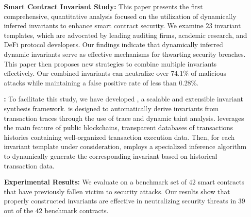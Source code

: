 \noindent \textbf{Smart Contract Invariant Study:}
This paper presents the first comprehensive, quantitative analysis focused on
the utilization of dynamically inferred invariants to enhance smart contract security. We
examine $23$ invariant templates, which are advocated by leading auditing firms,
academic research, and DeFi protocol developers. Our findings indicate that
dynamically inferred dynamic invariants serve as effective mechanisms for 
thwarting security
breaches. This paper then proposes new strategies to combine multiple invariants effectively.
Our combined invariants can neutralize over
74.1\% of malicious attacks while maintaining a false positive rate of less than
0.28\%.

\noindent \textbf{{\name}:}
To facilitate this study, we have developed {\name}, a scalable and extensible
invariant synthesis framework. {\name} is designed to automatically derive
invariants from transaction traces through the use of trace and dynamic taint analysis. 
{\name} leverages the main feature of public blockchains, 
transparent databases of transactions histories containing well-organized transaction execution data. 
Then, for each invariant template under consideration, {\name} employs a specialized inference
algorithm to dynamically generate the corresponding invariant based on
historical transaction data. 

\noindent \textbf{Experimental Results:}
We evaluate {\name} on a benchmark set of $42$ smart contracts that have
previously fallen victim to security attacks. Our results show that properly
constructed invariants are effective in neutralizing security threats in $39$
out of the $42$ benchmark contracts. 

